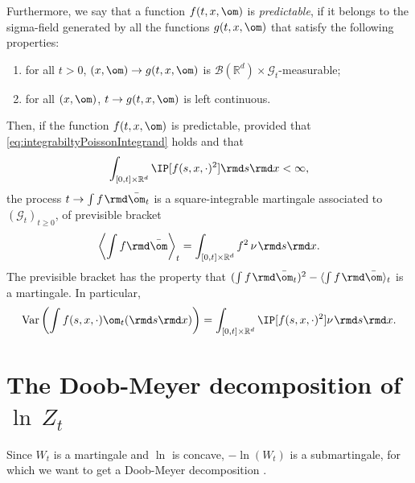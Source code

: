Furthermore, we say that a function $f(t,x,\om)$ is \emph{predictable}, if it belongs to the sigma-field generated by all the functions $g(t,x,\om)$ that satisfy the following properties:
\begin{enumerate}[label=(\roman*)]
\item for all $t>0$, $(x,\om)\to g(t,x,\om)$ is $\mathcal{B}(\mathbb{R}^d) \times \mathcal{G}_t$-measurable;
\item for all $(x,\om)$, $t\to g(t,x,\om)$ is left continuous.
\end{enumerate}
Then, if the function $f(t,x,\om)$ is predictable, provided that \eqref{eq:integrabiltyPoissonIntegrand} holds and that
\[\int_{[0,t]\times\mathbb{R}^d} \IP[f(s,x,\cdot)^2]\rmd s \rmd x < \infty,\]
the process $t\to \int f \hspace{0.3mm} \rmd \bar \om_t$ is a square-integrable martingale associated to $(\mathcal{G}_t)_{t\geq 0}$, of previsible bracket \cite[Section II.3.]{IkedaWatanabe}
\begin{equation} \label{eq:bracket}
\left\langle \int f \rmd \bar \om \right\rangle_t = \int_{[0,t]\times \mathbb{R}^d} f^2\, \nu \hspace{0.3mm} \rmd s \rmd x.
\end{equation}
The previsible bracket has the property that $ (\int f \hspace{0.3mm} \rmd \bar \om_t)^2 - \langle \int f \hspace{0.3mm} \rmd \bar \om \rangle_t$ is a martingale. In particular,
\begin{equation} \label{eq:MartingaleVarianceFormula}
\mathrm{Var} \left(\int f(s,x,\cdot) \om_t(\rmd s \rmd x)\right) = \int_{[0,t]\times \mathbb{R}^d} \IP[ f(s,x,\cdot)^2] \nu \hspace{0.3mm} \rmd s \rmd x.
\end{equation}


\section{The Doob-Meyer decomposition of $\ln \, Z_t$}
Since $W_t$ is a martingale and $\ln$ is concave, $-\ln(W_t)$ is a submartingale, for which we  
want to get a Doob-Meyer decomposition \cite[Ch.VI]{RogersWilliams}.

